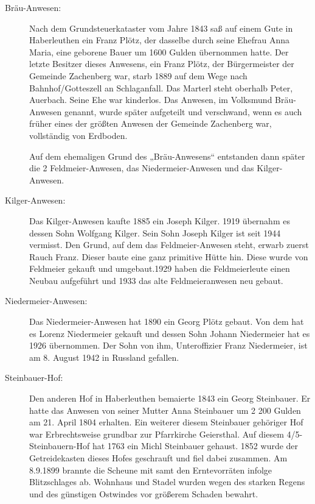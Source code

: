 \documentclass[12pt,a4pager]{book}
\begin{document}
\begin{description}
\item[Bräu-Anwesen:] Nach dem Grundsteuerkataster vom Jahre 1843 saß auf einem
Gute in Haberleuthen ein Franz Plötz, der dasselbe durch seine Ehefrau Anna
Maria, eine geborene Bauer um 1600 Gulden übernommen hatte. Der letzte Besitzer
dieses Anwesens, ein Franz Plötz, der Bürgermeister der Gemeinde Zachenberg war,
starb 1889 auf dem Wege nach Bahnhof/Gotteszell an Schlaganfall. Das Marterl
steht oberhalb Peter, Auerbach. Seine Ehe war kinderlos. Das Anwesen, im
Volksmund Bräu-Anwesen genannt, wurde später aufgeteilt und verschwand, wenn es
auch früher eines der größten Anwesen der Gemeinde Zachenberg war, vollständig
von Erdboden.

Auf dem ehemaligen Grund des „Bräu-Anwesens“ entstanden dann später die 2
Feldmeier-Anwesen, das Niedermeier-Anwesen und das Kilger-Anwesen.

\item[Kilger-Anwesen:] Das Kilger-Anwesen kaufte 1885 ein Joseph Kilger. 1919
übernahm es dessen Sohn Wolfgang Kilger. Sein Sohn Joseph Kilger ist seit 1944
vermisst. Den Grund, auf dem das Feldmeier-Anwesen steht, erwarb zuerst Rauch
Franz. Dieser baute eine ganz primitive Hütte hin. Diese wurde von Feldmeier
gekauft und umgebaut.1929 haben die Feldmeierleute einen Neubau aufgeführt und
1933 das alte Feldmeieranwesen neu gebaut.

\item[Niedermeier-Anwesen:] Das Niedermeier-Anwesen hat 1890 ein Georg Plötz
gebaut. Von dem hat es Lorenz Niedermeier gekauft und dessen Sohn Johann
Niedermeier hat es 1926 übernommen. Der Sohn von ihm, Unteroffizier Franz
Niedermeier, ist am 8. August 1942 in Russland gefallen.

\item[Steinbauer-Hof:] Den anderen Hof in Haberleuthen bemaierte 1843 ein Georg
Steinbauer. Er hatte das Anwesen von seiner Mutter Anna Steinbauer um 2 200
Gulden am 21. April 1804 erhalten. Ein weiterer diesem Steinbauer gehöriger Hof
war Erbrechtsweise grundbar zur Pfarrkirche Geiersthal. Auf diesem
4/5-Steinbauern-Hof hat 1763 ein Michl Steinbauer gehaust. 1852 wurde der
Getreidekasten dieses Hofes geschrauft und fiel dabei zusammen. Am 8.9.1899
brannte die Scheune mit samt den Erntevorräten infolge Blitzschlages ab.
Wohnhaus und Stadel wurden wegen des starken Regens und des günstigen Ostwindes
vor größerem Schaden bewahrt.
\end{description}
\end{document}
